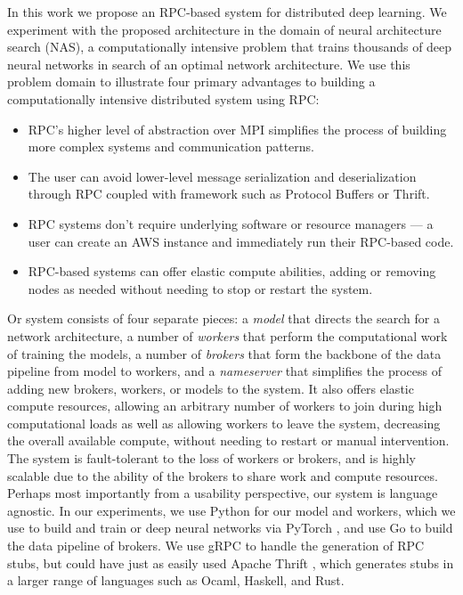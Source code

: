 \documentclass[conference]{IEEEtran}
\begin{document}
In this work we propose an RPC-based system for distributed deep learning. We
experiment with the proposed architecture in the domain of neural architecture
search (NAS), a computationally intensive problem that trains thousands of deep
neural networks in search of an optimal network architecture.  We use this
problem domain to illustrate four primary advantages to building a
computationally intensive distributed system using RPC:
\begin{itemize}
\item RPC's higher level of abstraction over MPI simplifies the process of
  building more complex systems and communication patterns.
\item The user can avoid lower-level message serialization and deserialization
  through RPC coupled with framework such as Protocol Buffers or Thrift.
\item RPC systems don't require underlying software or resource managers --- a
  user can create an AWS instance and immediately run their RPC-based code.
\item RPC-based systems can offer elastic compute abilities, adding or removing
  nodes as needed without needing to stop or restart the system.
\end{itemize}
Or system consists of four separate pieces: a \emph{model} that directs the
search for a network architecture, a number of \emph{workers} that perform the
computational work of training the models, a number of \emph{brokers} that form
the backbone of the data pipeline from model to workers, and a \emph{nameserver}
that simplifies the process of adding new brokers, workers, or models to the
system. It also offers elastic compute resources, allowing an arbitrary number
of workers to join during high computational loads as well as allowing workers
to leave the system, decreasing the overall available compute, without needing
to restart or manual intervention.  The system is fault-tolerant to the loss of
workers or brokers, and is highly scalable due to the ability of the brokers to
share work and compute resources. Perhaps most importantly from a usability
perspective, our system is language agnostic. In our experiments, we use Python
for our model and workers, which we use to build and train or deep neural
networks via PyTorch \cite{paszke2017automatic}, and use Go to build the data
pipeline of brokers. We use gRPC \cite{Wang:1993:GCC:155870.155881} to handle
the generation of RPC stubs, but could have just as easily used Apache Thrift
\cite{Slee2007}, which generates stubs in a larger range of languages such as
Ocaml, Haskell, and Rust.
\end{document}
